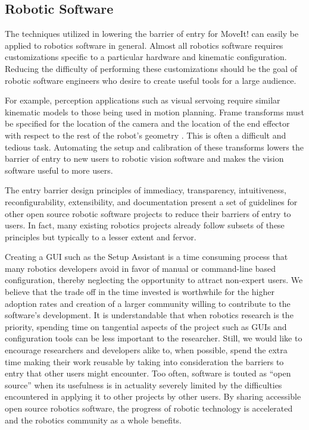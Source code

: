 \documentclass[10pt,journal,compsoc]{joser1}
\begin{document}
{\subsection{Robotic Software}
\label{sec::robotic_discussion}

The techniques utilized in lowering the barrier of entry for MoveIt! can easily be applied to robotics software in general. Almost all robotics software requires customizations specific to a particular hardware and kinematic configuration. Reducing the difficulty of performing these customizations should be the goal of robotic software engineers who desire to create useful tools for a large audience. 

For example, perception applications such as visual servoing require similar kinematic models to those being used in motion planning. Frame transforms must be specified for the location of the camera and the location of the end effector with respect to the rest of the robot's geometry \cite{visual_servoing}. This is often a difficult and tedious task. Automating the setup and calibration of these transforms lowers the barrier of entry to new users to robotic vision software and makes the vision software useful to more users.

The entry barrier design principles of immediacy, transparency, intuitiveness, reconfigurability, extensibility, and documentation present a set of guidelines for other open source robotic software projects to reduce their barriers of entry to users. In fact, many existing robotics projects already follow subsets of these principles but typically to a lesser extent and fervor.

Creating a GUI such as the Setup Assistant is a time consuming process that many robotics developers avoid in favor of manual or command-line based configuration, thereby neglecting the opportunity to attract non-expert users. We believe that the trade off in the time invested is worthwhile for the higher adoption rates and creation of a larger community willing to contribute to the software's development. It is understandable that when robotics research is the priority, spending time on tangential aspects of the project such as GUIs and configuration tools can be less important to the researcher. Still, we would like to encourage researchers and developers alike to, when possible, spend the extra time making their work reusable by taking into consideration the barriers to entry that other users might encounter. Too often, software is touted as ``open source'' when its usefulness is in actuality severely limited by the difficulties encountered in applying it to other projects by other users. By sharing 
accessible open source robotics software, the progress of robotic technology is accelerated and the robotics community as a whole benefits.

}
\end{document}
